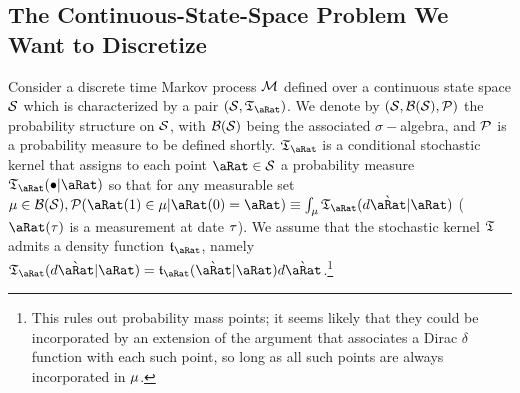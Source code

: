 \documentclass[\econtexRoot/BufferStockTheory.tex]{subfiles}
\begin{document}
\subsection{The Continuous-State-Space Problem We Want to Discretize} 
Consider a discrete time Markov process $\mathcal{M}$ defined over a continuous state space $\mathcal{S}$ which is characterized by a pair $(\SetFullCnts,\KrnPntNxtFmPntNow_{\pnt})$.   We denote by $(\mathcal{S},\mathcal{B}(\mathcal{S}),\mathcal{P})$ the probability structure on $\mathcal{S}$, with $\mathcal{B}(\mathcal{S})$ being the associated $\sigma-$algebra, and $\mathcal{P}$ is a probability measure to be defined shortly. $\KrnPntNxtFmPntNow_{\pnt}$ is a conditional stochastic kernel  that assigns to each point $\pnt \in \SetFullCnts$ a probability measure $\KrnPntNxtFmPntNow_{\pnt}(\bullet|\pnt)$ so that for any measurable set $\SetPartCnts \in \Borel(\SetFullCnts), \PrbFullCnts(\pnt(1) \in \SetPartCnts|\pnt(0)=\pnt) \equiv \int_{\SetPartCnts}\KrnPntNxtFmPntNow_{\pnt}(d\Nxt{\pnt}|\pnt)$ ($\pnt(\tAbs)$ is a measurement at date $\tau$).  We assume that the stochastic kernel $\mathfrak{T}$ admits a density function $\DnsPntNxtFmPntNow_{\pnt}$, namely $\KrnPntNxtFmPntNow_{\pnt}(d\Nxt{\pnt}|\pnt) = \DnsPntNxtFmPntNow_{\pnt}(\Nxt{\pnt}|\pnt)d\Nxt{\pnt}$.\footnote{This rules out probability mass points; it seems likely that they could be incorporated by an extension of the argument that associates a Dirac $\delta$ function with each such point, so long as all such points are always incorporated in $\mu$.}
\end{document}
